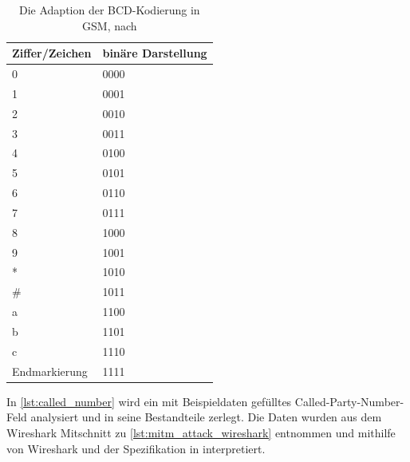 \begin{table}[H]
\centering
\begin{tabular}{|l|l|}
\hline
\rowcolor[HTML]{F7F7F7}
\textbf{Ziffer/Zeichen} & \textbf{binäre Darstellung} \\ \hline
0                       & 0000                        \\ \hline
1                       & 0001                        \\ \hline
2                       & 0010                        \\ \hline
3                       & 0011                        \\ \hline
4                       & 0100                        \\ \hline
5                       & 0101                        \\ \hline
6                       & 0110                        \\ \hline
7                       & 0111                        \\ \hline
8                       & 1000                        \\ \hline
9                       & 1001                        \\ \hline
*                       & 1010                        \\ \hline
\#                      & 1011                        \\ \hline
a                       & 1100                        \\ \hline
b                       & 1101                        \\ \hline
c                       & 1110                        \\ \hline
Endmarkierung           & 1111                        \\ \hline
\end{tabular}
\caption[Die Adaption der BCD-Kodierung in GSM]{Die Adaption der \ac{BCD}-Kodierung in \ac{GSM}, nach }
\label{tab:bcd}
\end{table}

In \autoref{lst:called_number} wird ein mit Beispieldaten gefülltes Called-Party-Number-Feld analysiert und in seine Bestandteile zerlegt. Die Daten wurden aus dem Wireshark Mitschnitt zu \autoref{lst:mitm_attack_wireshark} entnommen und mithilfe von Wireshark und der Spezifikation in  interpretiert.\\

